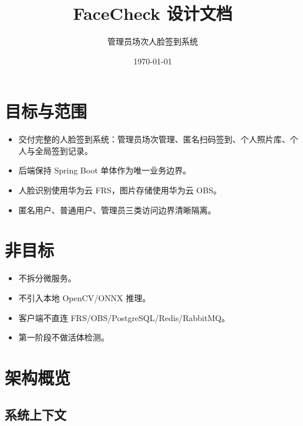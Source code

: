 \documentclass[11pt,a4paper]{ctexart}
\begin{document}
\title{\Huge FaceCheck 设计文档}
\author{管理员场次人脸签到系统}
\date{\today}
\maketitle
\thispagestyle{fancy}

\tableofcontents
\newpage

\section{目标与范围}

\begin{itemize}[leftmargin=2.5em]
  \item 交付完整的人脸签到系统：管理员场次管理、匿名扫码签到、个人照片库、个人与全局签到记录。
  \item 后端保持 Spring Boot 单体作为唯一业务边界。
  \item 人脸识别使用华为云 FRS，图片存储使用华为云 OBS。
  \item 匿名用户、普通用户、管理员三类访问边界清晰隔离。
\end{itemize}

\section{非目标}

\begin{itemize}[leftmargin=2.5em]
  \item 不拆分微服务。
  \item 不引入本地 OpenCV/ONNX 推理。
  \item 客户端不直连 FRS/OBS/PostgreSQL/Redis/RabbitMQ。
  \item 第一阶段不做活体检测。
\end{itemize}

\section{架构概览}

\subsection{系统上下文}
\end{document}
